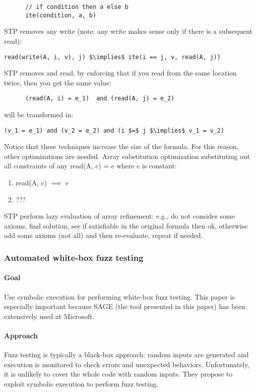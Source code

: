 \begin{itemize}
\begin{lstlisting}
      // if condition then a else b
      ite(condition, a, b) 
    \end{lstlisting}
      STP removes any write (note: any write makes sense only if there is a subsequent read):
    \begin{lstlisting}[mathescape=true]
      read(write(A, i, v), j) $\implies$ ite(i == j, v, read(A, j))
    \end{lstlisting}
      STP removes and read, by enforcing that if you read from the same location twice, then you get the same value:
    \begin{lstlisting}
      (read(A, i) = e_1)  and (read(A, j) = e_2)
    \end{lstlisting}
    will be transformed in:
    \begin{lstlisting}[mathescape=true]
      (v_1 = e_1) and (v_2 = e_2) and (i $=$ j $\implies$ v_1 = v_2)
    \end{lstlisting}
  Notice that these techniques increase the size of the formula. For this reason, other optimizations are needed. Array substitution optimization substituting out all constraints of any read(A, c) = e where c is constant:
  \begin{enumerate}
    \item read(A, c) $\implies$ e
    \item ???
  \end{enumerate}
  STP perform lazy evaluation of array refinement: e.g., do not consider some axioms, find solution, see if satisfiable in the original formula then ok, otherwise add some axioms (not all) and then re-evaluate, repeat if needed.

\end{itemize}

\subsubsection{\cite{SAGE-NDSS08} Automated white-box fuzz testing} 

\paragraph{Goal}
Use symbolic execution for performing white-box fuzz testing. This paper is especially important because SAGE (the tool presented in this paper) has been extensively used at Microsoft.

\paragraph{Approach}
Fuzz testing is typically a black-box approach: random inputs are generated and execution is monitored to check errors and unexpected behaviors. Unfortunately, it is unlikely to cover the whole code with random inputs. They propose to exploit symbolic execution to perform fuzz testing.

